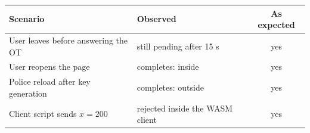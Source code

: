 \begin{tabular}{llc}
\hline
Scenario & Observed & As expected \\
\hline
User leaves before answering the OT & still pending after 15 s & yes \\
User reopens the page & completes: inside & yes \\
Police reload after key generation & completes: outside & yes \\
Client script sends $x = 200$ & rejected inside the WASM client & yes \\
\hline
\end{tabular}
